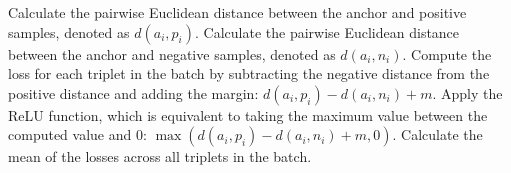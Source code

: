 Calculate the pairwise Euclidean distance between the anchor and positive samples, denoted as $d(a_i, p_i)$.
Calculate the pairwise Euclidean distance between the anchor and negative samples, denoted as $d(a_i, n_i)$.
Compute the loss for each triplet in the batch by subtracting the negative distance from the positive distance and adding the margin: $d(a_i, p_i) - d(a_i, n_i) + m$.
Apply the ReLU function, which is equivalent to taking the maximum value between the computed value and 0: $\max \left( d(a_i, p_i) - d(a_i, n_i) + m, 0 \right)$.
Calculate the mean of the losses across all triplets in the batch.